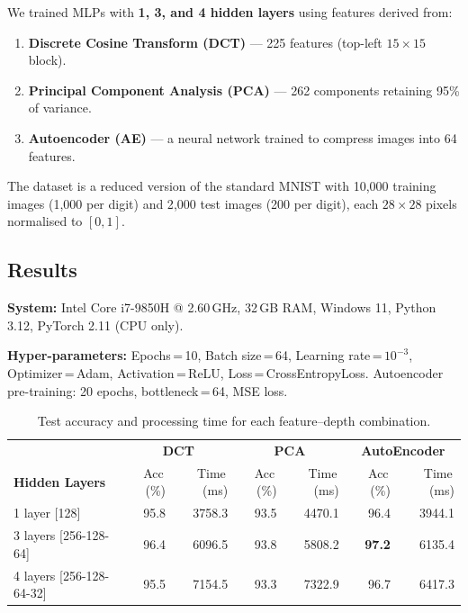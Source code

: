 \documentclass[12pt, a4paper]{article}
\renewcommand{\arraystretch}{1.12}
\begin{document}
We trained MLPs with \textbf{1, 3, and 4 hidden layers} using features derived from:
\begin{enumerate}
    \item \textbf{Discrete Cosine Transform (DCT)} --- 225 features (top-left $15 \times 15$ block).
    \item \textbf{Principal Component Analysis (PCA)} --- 262 components retaining 95\% of variance.
    \item \textbf{Autoencoder (AE)} --- a neural network trained to compress images into 64 features.
\end{enumerate}

The dataset is a reduced version of the standard MNIST with 10{,}000 training images
(1{,}000 per digit) and 2{,}000 test images (200 per digit), each $28 \times 28$ pixels
normalised to $[0, 1]$.

\subsection{Results}

\textbf{System:} Intel Core i7-9850H @ 2.60\,GHz, 32\,GB RAM, Windows 11, Python 3.12, PyTorch 2.11 (CPU only).

\textbf{Hyper-parameters:} Epochs\,=\,10, Batch size\,=\,64, Learning rate\,=\,$10^{-3}$,
Optimizer\,=\,Adam, Activation\,=\,ReLU, Loss\,=\,CrossEntropyLoss.
Autoencoder pre-training: 20 epochs, bottleneck\,=\,64, MSE loss.

\begin{table}[H]
\centering
\renewcommand{\arraystretch}{1.3}
\begin{tabular}{l | r r | r r | r r}
\toprule
& \multicolumn{2}{c|}{\textbf{DCT}} & \multicolumn{2}{c|}{\textbf{PCA}} & \multicolumn{2}{c}{\textbf{AutoEncoder}} \\
\textbf{Hidden Layers} & Acc\,(\%) & Time\,(ms) & Acc\,(\%) & Time\,(ms) & Acc\,(\%) & Time\,(ms) \\
\midrule
1 layer [128]           & 95.8 & 3758.3 & 93.5 & 4470.1 & 96.4 & 3944.1 \\
3 layers [256-128-64]   & 96.4 & 6096.5 & 93.8 & 5808.2 & \textbf{97.2} & 6135.4 \\
4 layers [256-128-64-32]& 95.5 & 7154.5 & 93.3 & 7322.9 & 96.7 & 6417.3 \\
\bottomrule
\end{tabular}
\caption{Test accuracy and processing time for each feature--depth combination.}
\label{tab:results}
\end{table}
\end{document}
